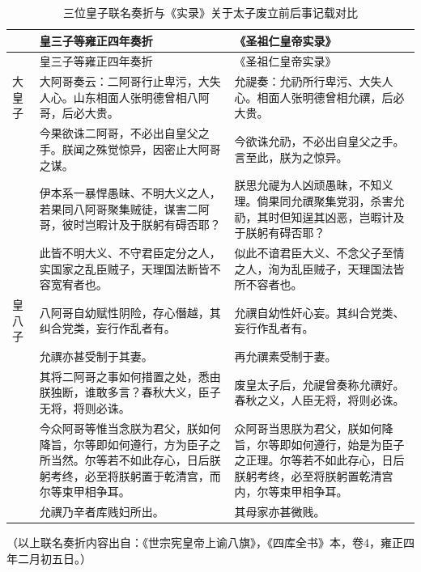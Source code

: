 \begingroup\small\setlength{\tabcolsep}{4pt}\renewcommand{\arraystretch}{1.18}
\setlength{\LTpost}{3pt}\setlength{\parskip}{0pt}
\begin{longtable}{|p{3em}|p{}|p{}|}
\caption{三位皇子联名奏折与《实录》关于太子废立前后事记载对比}\label{tab:comparison}\\
\hline
 & 皇三子等雍正四年奏折 & 《圣祖仁皇帝实录》\\\hline\endfirsthead
\hline & 皇三子等雍正四年奏折 & 《圣祖仁皇帝实录》\\\hline\endhead
\endfoot
大皇子 & 大阿哥奏云：二阿哥行止卑污，大失人心。山东相面人张明德曾相八阿哥，后必大贵。 & 允禔奏：允礽所行卑污、大失人心。相面人张明德曾相允禩，后必大贵。\\\hline
 & 今果欲诛二阿哥，不必出自皇父之手。朕闻之殊觉惊异，因密止大阿哥之谋。 & 今欲诛允礽，不必出自皇父之手。言至此，朕为之惊异。\\\hline
 & 伊本系一暴悍愚昧、不明大义之人，若果同八阿哥聚集贼徒，谋害二阿哥，彼时岂暇计及于朕躬有碍否耶？ & 朕思允禔为人凶顽愚昧，不知义理。倘果同允禩聚集党羽，杀害允礽，其时但知逞其凶恶，岂暇计及于朕躬有碍否耶？\\\hline
 & 此皆不明大义、不守君臣定分之人，实国家之乱臣贼子，天理国法断皆不容宽宥者也。 & 似此不谙君臣大义、不念父子至情之人，洵为乱臣贼子，天理国法皆所不容者也。\\\hline
皇八子 & 八阿哥自幼赋性阴险，存心僭越，其纠合党类，妄行作乱者有。 & 允禩自幼性奸心妄。其纠合党类、妄行作乱者有。\\\hline
 & 允禩亦甚受制于其妻。 & 再允禩素受制于妻。\\\hline
 & 其将二阿哥之事如何措置之处，悉由朕独断，谁敢多言？春秋大义，臣子无将，将则必诛。 & 废皇太子后，允禔曾奏称允禩好。春秋之义，人臣无将，将则必诛。\\\hline
 & 今众阿哥等惟当念朕为君父，朕如何降旨，尔等即如何遵行，方为臣子之所当然。尔等若不如此存心，日后朕躬考终，必至将朕躬置于乾清宫，而尔等束甲相争耳。 & 众阿哥当思朕为君父，朕如何降旨，尔等即如何遵行，始是为臣子之正理。尔等若不如此存心，日后朕躬考终，必至将朕躬置乾清宫内，尔等束甲相争耳。\\\hline
 & 允禩乃辛者库贱妇所出。 & 其母家亦甚微贱。\\\hline
\end{longtable}
\noindent（以上联名奏折内容出自：《世宗宪皇帝上谕八旗》，《四库全书》本，卷4，雍正四年二月初五日。）
\par\endgroup

